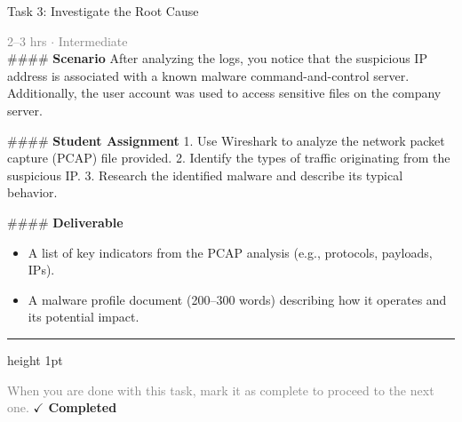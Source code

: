 \documentclass[10pt,a4paper]{article}
\begin{document}
\begin{taskbox}{Task 3: Investigate the Root Cause}

    {\small \textcolor{gray}{2--3 hrs $\cdot$ Intermediate}}\\[12pt]

    \#\#\#\# \textbf{Scenario}  
After analyzing the logs, you notice that the suspicious IP address is associated with a known malware command-and-control server. Additionally, the user account was used to access sensitive files on the company server.

\#\#\#\# \textbf{Student Assignment}  
1. Use Wireshark to analyze the network packet capture (PCAP) file provided.  
2. Identify the types of traffic originating from the suspicious IP.  
3. Research the identified malware and describe its typical behavior.  

\#\#\#\# \textbf{Deliverable}  
\begin{itemize}
    \item A list of key indicators from the PCAP analysis (e.g., protocols, payloads, IPs).  
    \item A malware profile document (200–300 words) describing how it operates and its potential impact.\par
\end{itemize}

    \vspace{16pt}

    \textcolor{cardBorder}{\hrule height 1pt}\vspace{8pt}

    \small \textcolor{gray}{When you are done with this task, mark it as complete to proceed to the next one.} \hfill \textbf{\textcolor{brandDark}{$\checkmark$ Completed}}

\end{taskbox}
\end{document}
